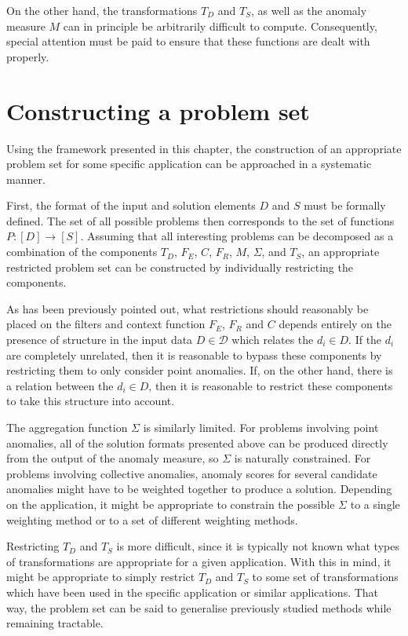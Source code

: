 On the other hand, the transformations $T_D$ and $T_S$, as well as the anomaly measure $M$ can in principle be arbitrarily difficult to compute. Consequently, special attention must be paid to ensure that these functions are dealt with properly.

\section{Constructing a problem set}

Using the framework presented in this chapter, the construction of an appropriate problem set for some specific application can be approached in a systematic manner.

First, the format of the input and solution elements $D$ and $S$ must be formally defined. The set of all possible problems then corresponds to the set of functions $P: [D] \rightarrow [S]$. Assuming that all interesting problems can be decomposed as a combination of the components $T_D$, $F_E$, $C$, $F_R$, $M$, $\Sigma$, and $T_S$, an appropriate restricted problem set can be constructed by individually restricting the components.

As has been previously pointed out, what restrictions should reasonably be placed on the filters and context function $F_E$, $F_R$ and $C$ depends entirely on the presence of structure in the input data $D \in \mathcal{D}$ which relates the $d_i \in D$. If the $d_i$ are completely unrelated, then it is reasonable to bypass these components by restricting them to only consider point anomalies. If, on the other hand, there is a relation between the $d_i \in D$, then it is reasonable to restrict these components to take this structure into account.

The aggregation function $\Sigma$ is similarly limited. For problems involving point anomalies, all of the solution formats presented above can be produced directly from the output of the anomaly measure, so $\Sigma$ is naturally constrained. For problems involving collective anomalies, anomaly scores for several candidate anomalies might have to be weighted together to produce a solution. Depending on the application, it might be appropriate to constrain the possible $\Sigma$ to a single weighting method or to a set of different weighting methods.

Restricting $T_D$ and $T_S$ is more difficult, since it is typically not known what types of transformations are appropriate for a given application. With this in mind, it might be appropriate to simply restrict $T_D$ and $T_S$ to some set of transformations which have been used in the specific application or similar applications. That way, the problem set can be said to generalise previously studied methods while remaining tractable.

